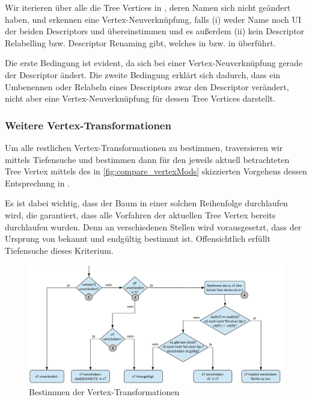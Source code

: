 Wir iterieren über alle die Tree Vertices  in , deren Namen sich nicht geändert haben, und erkennen eine Vertex-Neuverknüpfung, falls (i) weder Name noch UI der beiden Descriptors  und  übereinstimmen und es außerdem (ii) kein Descriptor Relabelling bzw. Descriptor Renaming gibt, welches  in  bzw.  in  überführt.\par

Die erste Bedingung ist evident, da sich bei einer Vertex-Neuverknüpfung gerade der Descriptor ändert. Die zweite Bedingung erklärt sich dadurch, dass ein Umbenennen oder Relabeln eines Descriptors zwar den Descriptor verändert, nicht aber eine Vertex-Neuverknüpfung für dessen Tree Vertices darstellt. \par   

\subsubsection{Weitere Vertex-Transformationen}
\label{sec_weitere_vertex_mods}

Um alle restlichen Vertex-Transformationen zu bestimmen, traversieren wir  mittels Tiefensuche und bestimmen dann für den jeweils aktuell betrachteten Tree Vertex  mittels des in \autoref{fig:compare_vertexMods} skizzierten Vorgehens dessen Entsprechung  in .\par

Es ist dabei wichtig, dass der Baum in einer solchen Reihenfolge durchlaufen wird, die garantiert, dass alle Vorfahren der aktuellen Tree Vertex bereits durchlaufen wurden. Denn an verschiedenen Stellen wird vorausgesetzt, dass der Ursprung von  bekannt und endgültig bestimmt ist. Offensichtlich erfüllt Tiefensuche dieses Kriterium. \par  

\begin{figure}[h]
\begin{center}
\includegraphics[width=1.05\textwidth]{figs/compare_vertexMods.pdf}
\end{center}
\caption{Bestimmen der Vertex-Transformationen}
\label{fig:compare_vertexMods}
\end{figure}

